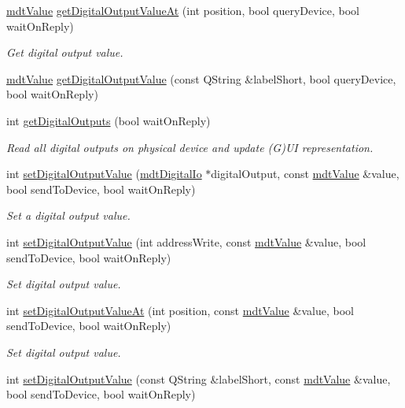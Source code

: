 \begin{DoxyCompactItemize}
\hyperlink{classmdt_value}{mdt\-Value} \hyperlink{classmdt_device_abdd55e5a7bbfe268fc3c790e81da373a}{get\-Digital\-Output\-Value\-At} (int position, bool query\-Device, bool wait\-On\-Reply)
\begin{DoxyCompactList}\small\item\em Get digital output value. \end{DoxyCompactList}\item 
\hyperlink{classmdt_value}{mdt\-Value} \hyperlink{classmdt_device_a5e7b7de4243f45d8cfa42599d51555bf}{get\-Digital\-Output\-Value} (const Q\-String \&label\-Short, bool query\-Device, bool wait\-On\-Reply)
\item 
int \hyperlink{classmdt_device_ab35b81b8eb68e161ac06ae882be39a25}{get\-Digital\-Outputs} (bool wait\-On\-Reply)
\begin{DoxyCompactList}\small\item\em Read all digital outputs on physical device and update (G)U\-I representation. \end{DoxyCompactList}\item 
int \hyperlink{classmdt_device_a04564fd9be440c026e7c399f0e619485}{set\-Digital\-Output\-Value} (\hyperlink{classmdt_digital_io}{mdt\-Digital\-Io} $\ast$digital\-Output, const \hyperlink{classmdt_value}{mdt\-Value} \&value, bool send\-To\-Device, bool wait\-On\-Reply)
\begin{DoxyCompactList}\small\item\em Set a digital output value. \end{DoxyCompactList}\item 
int \hyperlink{classmdt_device_a5c2514c3c31a687a01a898c874d2c45e}{set\-Digital\-Output\-Value} (int address\-Write, const \hyperlink{classmdt_value}{mdt\-Value} \&value, bool send\-To\-Device, bool wait\-On\-Reply)
\begin{DoxyCompactList}\small\item\em Set digital output value. \end{DoxyCompactList}\item 
int \hyperlink{classmdt_device_a6b906f01f6b0bdc8586df09a872173ef}{set\-Digital\-Output\-Value\-At} (int position, const \hyperlink{classmdt_value}{mdt\-Value} \&value, bool send\-To\-Device, bool wait\-On\-Reply)
\begin{DoxyCompactList}\small\item\em Set digital output value. \end{DoxyCompactList}\item 
int \hyperlink{classmdt_device_a2377d24cc1e767a24dfc5e34454a8737}{set\-Digital\-Output\-Value} (const Q\-String \&label\-Short, const \hyperlink{classmdt_value}{mdt\-Value} \&value, bool send\-To\-Device, bool wait\-On\-Reply)

\end{DoxyCompactItemize}
